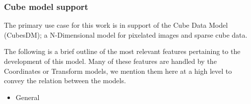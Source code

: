 \documentclass[11pt,a4paper]{ivoa}
\begin{document}
\subsubsection{Cube model support}
\label{uc:Cube-model-support}
  The primary use case for this work is in support of the Cube Data Model (CubesDM);
  a N-Dimensional model for pixelated images and sparse cube data. 
 
  The following is a brief outline of the most relevant features pertaining to the
  development of this model.  Many of these features are handled by the Coordinates or Transform models,
  we mention them here at a high level to convey the relation between the models.

  \begin{itemize}
    \item General
    \begin{itemize}


\end{itemize}
\end{itemize}
\end{document}
